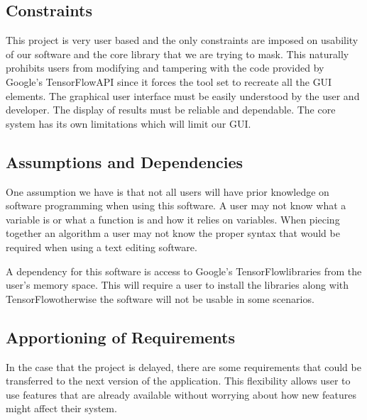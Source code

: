 \documentclass[journal,10pt,onecolumn,compsoc]{IEEEtran} \usepackage[margin=1.0in]{geometry} \usepackage{pdfpages} \usepackage{graphicx}
\begin{document}
\subsection{Constraints}

This project is very user based and the only constraints are imposed on usability of our software and the core library that we are trying to mask. 
This naturally prohibits users from modifying and tampering with the code provided by Google's TensorFlow\texttrademark API since it forces the tool set to recreate all the GUI elements.
The graphical user interface must be easily understood by the user and developer.
The display of results must be reliable and dependable.
The core system has its own limitations which will limit our GUI.

\subsection{Assumptions and Dependencies}

One assumption we have is that not all users will have prior knowledge on software programming when using this software.
A user may not know what a variable is or what a function is and how it relies on variables. 
When piecing together an algorithm a user may not know the proper syntax that would be required when using a text editing software.

A dependency for this software is access to Google's TensorFlow\texttrademark libraries from the user's memory space. 
This will require a user to install the libraries along with TensorFlow\texttrademark otherwise the software will not be usable in some scenarios.

\subsection{Apportioning of Requirements}

In the case that the project is delayed, there are some requirements that could be transferred to the next version of the application. 
This flexibility allows user to use features that are already available without worrying about how new features might affect their system.
\end{document}
